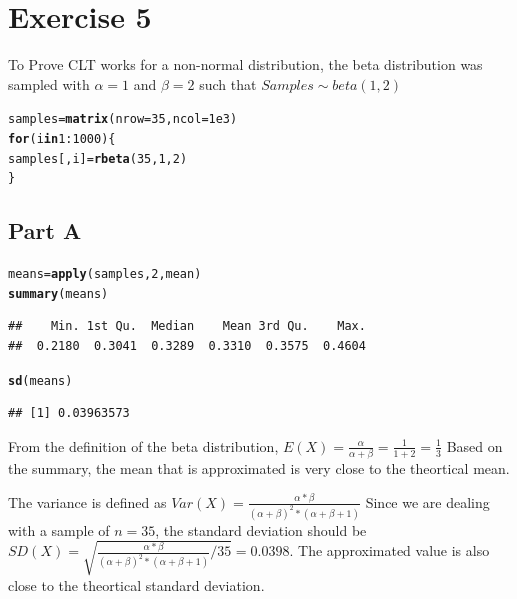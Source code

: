 \documentclass{article}\usepackage[]{graphicx}\usepackage[]{color}
\makeatletter
\newcommand{\hlnum}[1]{\textcolor[rgb]{0.686,0.059,0.569}{#1}}%
\newcommand{\hlopt}[1]{\textcolor[rgb]{0,0,0}{#1}}%
\newcommand{\hlstd}[1]{\textcolor[rgb]{0.345,0.345,0.345}{#1}}%
\newcommand{\hlkwa}[1]{\textcolor[rgb]{0.161,0.373,0.58}{\textbf{#1}}}%
\newcommand{\hlkwb}[1]{\textcolor[rgb]{0.69,0.353,0.396}{#1}}%
\newcommand{\hlkwc}[1]{\textcolor[rgb]{0.333,0.667,0.333}{#1}}%
\newcommand{\hlkwd}[1]{\textcolor[rgb]{0.737,0.353,0.396}{\textbf{#1}}}%
\newenvironment{kframe}{%
 \def\at@end@of@kframe{}%
 \ifinner\ifhmode%
  \def\at@end@of@kframe{\end{minipage}}%
  \begin{minipage}{\columnwidth}%
 \fi\fi%
 \def\FrameCommand##1{\hskip\@totalleftmargin \hskip-\fboxsep
 \colorbox{shadecolor}{##1}\hskip-\fboxsep
     \hskip-\linewidth \hskip-\@totalleftmargin \hskip\columnwidth}%
 \MakeFramed {\advance\hsize-\width
   \@totalleftmargin\z@ \linewidth\hsize
   \@setminipage}}%
 {\par\unskip\endMakeFramed%
 \at@end@of@kframe}
\newenvironment{knitrout}{}{} %
\makeatother
\begin{document}
\section*{Exercise 5}
To Prove CLT works for a non-normal distribution, the beta distribution was sampled with $\alpha = 1$ and $\beta=2$ such that $Samples \sim beta(1,2)$
\begin{knitrout}
\color{fgcolor}\begin{kframe}
\begin{alltt}
\hlstd{samples} \hlkwb{=} \hlkwd{matrix}\hlstd{(}\hlkwc{nrow} \hlstd{=} \hlnum{35}\hlstd{,} \hlkwc{ncol} \hlstd{=} \hlnum{1e3}\hlstd{)}
\hlkwa{for}\hlstd{(i} \hlkwa{in} \hlnum{1}\hlopt{:}\hlnum{1000}\hlstd{)\{}
  \hlstd{samples[,i]} \hlkwb{=} \hlkwd{rbeta}\hlstd{(}\hlnum{35}\hlstd{,} \hlnum{1}\hlstd{,}\hlnum{2}\hlstd{)}
\hlstd{\}}
\end{alltt}
\end{kframe}
\end{knitrout}
\subsection*{Part A}
\begin{knitrout}
\color{fgcolor}\begin{kframe}
\begin{alltt}
\hlstd{means} \hlkwb{=} \hlkwd{apply}\hlstd{(samples,} \hlnum{2}\hlstd{, mean)}
\hlkwd{summary}\hlstd{(means)}
\end{alltt}
\begin{verbatim}
##    Min. 1st Qu.  Median    Mean 3rd Qu.    Max. 
##  0.2180  0.3041  0.3289  0.3310  0.3575  0.4604
\end{verbatim}
\begin{alltt}
\hlkwd{sd}\hlstd{(means)}
\end{alltt}
\begin{verbatim}
## [1] 0.03963573
\end{verbatim}
\end{kframe}
\end{knitrout}
From the definition of the beta distribution, $E(X) = \frac{\alpha}{\alpha+\beta}=\frac{1}{1+2}=\frac{1}{3}$
Based on the summary, the mean that is approximated is very close to the theortical mean.

The variance is defined as $Var(X)=\frac{\alpha*\beta}{(\alpha+\beta)^2*(\alpha+\beta+1)}$ Since we are dealing with a sample of $n=35$, the standard deviation should be $SD(X)=\sqrt{\frac{\alpha*\beta}{(\alpha+\beta)^2*(\alpha+\beta+1)}/35}= 0.0398$. The approximated value is also close to the theortical standard deviation.
\end{document}
